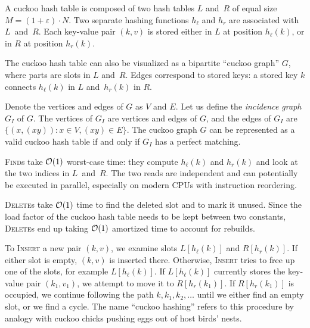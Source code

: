A cuckoo hash table is composed of two hash tables $L$ and~$R$ of equal size
$M=(1+\varepsilon)\cdot N$.
Two separate hashing functions $h_\ell$ and $h_r$ are associated with
$L$~and~$R$.
Each key-value pair $(k,v)$ is stored either in $L$ at position $h_\ell(k)$,
or in $R$ at position $h_r(k)$.

The cuckoo hash table can also be visualized as a bipartite ``cuckoo graph''
$G$, where parts are slots in $L$ and~$R$. Edges correspond to stored keys:
a stored key $k$ connects $h_\ell(k)$ in $L$ and~$h_r(k)$ in $R$.

Denote the vertices and edges of $G$ as $V$ and $E$.
Let us define the \emph{incidence graph} $G_I$ of $G$. The vertices of $G_I$
are vertices and edges of $G$, and the edges of $G_I$ are $\{(x,(xy)): x\in V,
(xy)\in E\}$. The cuckoo graph $G$ can be represented as a valid cuckoo hash
table if and only if $G_I$ has a perfect matching.

\textsc{Find}s take $\mathcal{O}(1)$ worst-case time: they compute $h_\ell(k)$ and $h_r(k)$
and look at the two indices in $L$~and~$R$. The two reads are independent and
can potentially be executed in parallel, especially on modern CPUs with
instruction reordering.

\textsc{Delete}s take $\mathcal{O}(1)$ time to find the deleted slot and to mark
it unused. Since the load factor of the cuckoo hash table needs to be kept
between two constants, \textsc{Delete}s end up taking $\mathcal{O}(1)$ amortized time
to account for rebuilds.

To \textsc{Insert} a new pair $(k,v)$, we examine slots $L[h_\ell(k)]$ and
$R[h_r(k)]$. If either slot is empty, $(k,v)$ is inserted there. Otherwise,
\textsc{Insert} tries to free up one of the slots, for example $L[h_\ell(k)]$.
If $L[h_\ell(k)]$ currently stores the key-value pair $(k_1,v_1)$, we attempt to
move it to $R[h_r(k_1)]$. If $R[h_r(k_1)]$ is occupied, we continue following
the path $k,k_1,k_2,\ldots$ until we either find an empty slot, or we find
a cycle.
The name ``cuckoo hashing'' refers to this procedure by analogy with
cuckoo chicks pushing eggs out of host birds' nests.


